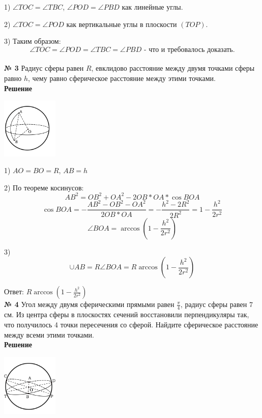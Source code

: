     1) $\angle TOC = \angle TBC$, $\angle POD = \angle PBD$ как линейные углы.

    2) $\angle TOC = \angle POD$ как вертикальные углы в плоскости $(TOP)$.

    3) Таким образом:
    \[
        \angle TOC = \angle POD = \angle TBC = \angle PBD \text{ - что и требовалось доказать.}
    \]\\


    \textbf{№ 3}
    Радиус сферы равен $R$, евклидово расстояние между двумя точками сферы равно $h$,
    чему равно сферическое расстояние между этими точками.\\

    \textbf{Решение}\\

    \begin{center}
        \includegraphics[width=0.2\textwidth]{images/img6}\\
    \end{center}

    1) $AO = BO = R$, $AB = h$

    2) По теореме косинусов:
    \[
        AB ^ 2 = OB ^ 2 + OA ^ 2 - 2OB*OA*\cos BOA
    \]
    \[
        \cos BOA = -\frac{AB^2 - OB^2 - OA^2}{2OB*OA} = -\frac{h^2 - 2R^2}{2R^2} = 1 - \frac{h^2}{2r^2}
    \]
    \[
        \angle BOA = \arccos \left(1 - \frac{h^2}{2r^2}\right)
    \]

    3)
    \[
        \cup AB = R\angle BOA = R \arccos \left(1 - \frac{h^2}{2r^2}\right)
    \]

    Ответ: $R \arccos \left(1 - \frac{h^2}{2r^2}\right)$\\


    \textbf{№ 4}
    Угол между двумя сферическими прямыми равен $\frac{\pi}{4}$, радиус сферы равен $7$ см.
    Из центра сферы в плоскостях сечений восстановили перпендикуляры так, что получилось 4 точки пересечения со сферой.
    Найдите сферическое расстояние между всеми этими точками.\\

    \textbf{Решение}\\

    \begin{center}
        \includegraphics[width=0.2\textwidth]{images/img8}\\
    \end{center}

